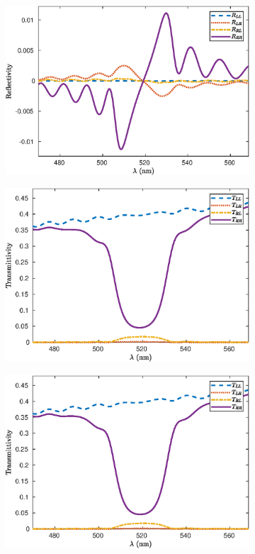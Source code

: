 \begin{figure}
\begin{subfigure}{0.32\linewidth}
		\includegraphics[width=\linewidth]{plots/simple/reflection_comp}
		\caption{}
		\label{fig:simple_cavity:reflection_comp}
	\end{subfigure}
	\begin{subfigure}{0.32\linewidth}
		\includegraphics[width=\linewidth]{plots/simple/transmission_oseen}
		\caption{}
		\label{fig:simple_cavity:transmission_oseen}
	\end{subfigure}
	\begin{subfigure}{0.32\linewidth}
		\includegraphics[width=\linewidth]{plots/simple/transmission_cwt}

\end{subfigure}
\end{figure}
